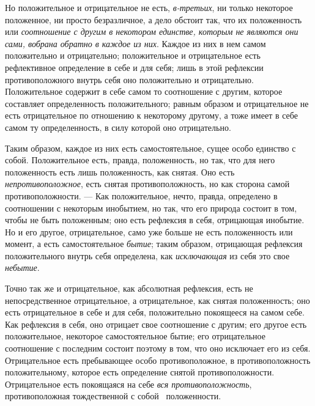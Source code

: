 Но положительное и отрицательное не есть,
{\em в-третьих}, ни только некоторое положенное, ни
просто безразличное, а дело обстоит так, что их положенность или
{\em соотношение с другим в некотором единстве, которым
не являются они сами, вобрана обратно в каждое из них}. Каждое из них в нем
самом положительно и отрицательно; положительное и отрицательное есть
рефлективное определение в себе и для себя; лишь в этой рефлексии
противоположного внутрь себя оно положительно и отрицательно. Положительное
содержит в себе самом то соотношение с другим, которое составляет
определенность положительного; равным образом и отрицательное не есть
отрицательное по отношению к некоторому другому, а тоже имеет в себе самом
ту определенность, в силу которой оно отрицательно.

Таким образом, каждое из них есть самостоятельное, сущее особо единство с
собой. Положительное есть, правда, положенность, но так, что для него
положенность есть лишь положенность, как снятая. Оно есть
{\em непротивоположное}, есть снятая противоположность,
но как сторона самой противоположности. — Как положительное, нечто, правда,
определено в соотношении с некоторым инобытием, но так, что его природа
состоит в том, чтобы не быть положенным; оно есть рефлексия в себя,
отрицающая инобытие. Но и его другое, отрицательное, само уже больше не
есть положенность или момент, а есть самостоятельное
{\em бытие}; таким образом, отрицающая рефлексия
положительного внутрь себя определена, как
{\em исключающая} из себя это свое
{\em небытие}.

Точно так же и отрицательное, как абсолютная рефлексия, есть не
непосредственное отрицательное, а отрицательное, как снятая положенность;
оно есть отрицательное в себе и для себя, положительно покоящееся на самом
себе. Как рефлексия в себя, оно отрицает свое соотношение с другим; его
другое есть положительное, некоторое самостоятельное бытие; его
отрицательное соотношение с последним состоит поэтому в том, что оно
исключает его из себя. Отрицательное есть пребывающее особо
противоположное, в противоположность положительному, которое есть
определение снятой противоположности. Отрицательное есть покоящаяся на себе
{\em вся противоположность}, противоположная
тождественной с собой \ положенности.

